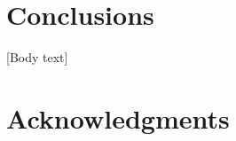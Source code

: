\documentclass{sig-alternate}
\begin{document}
\section{Conclusions}
\label{sec:conclusions}


[Body text]

\section*{Acknowledgments}
\label{sec:acknowledgments}




  

\end{document}

